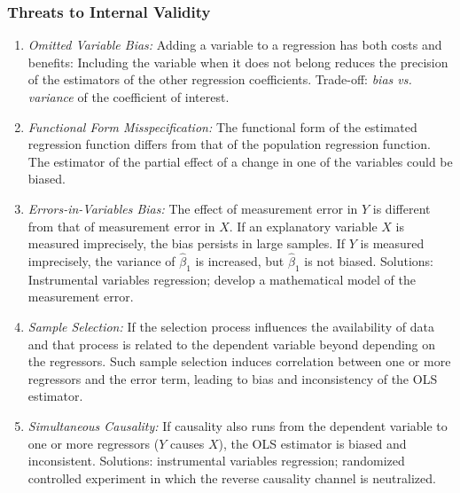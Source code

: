 

\begin{frame}[shrink=5]
\frametitle{Threats to Internal Validity}
\begin{enumerate}
\item \emph{Omitted Variable Bias:}
Adding a variable to a regression has both costs and benefits: Including the variable when it does not belong reduces the precision of the estimators of the other regression coefficients. Trade-off: \emph{bias vs. variance} of the coefficient of interest. 
\item \emph{Functional Form Misspecification:}
The functional form of the estimated regression function differs from that of the population regression function. The estimator of the partial effect of a change in one of the variables could be biased. 
\item \emph{Errors-in-Variables Bias:}
The effect of measurement error in $Y$ is different from that of measurement error in $X$. 
If an explanatory variable $X$ is measured imprecisely, the bias persists in large samples. 
If $Y$  is measured imprecisely, the variance of $\hat{\beta}_{1}$ is increased, but $\hat{\beta}_{1}$ is not biased. 
Solutions:
Instrumental variables regression; develop a mathematical model of the measurement error. 
\item \emph{Sample Selection:}
If the selection process influences the availability of data and that process is related to the dependent variable beyond depending on the regressors. Such sample selection induces correlation between one or more regressors and the error term, leading to bias and inconsistency of the OLS estimator.
\item \emph{Simultaneous Causality:}
If causality also runs from the dependent variable to one or more regressors ($Y$ causes $X$), the OLS estimator is biased and inconsistent. 
Solutions: instrumental variables regression;  randomized controlled experiment in which the reverse causality channel is neutralized.
\end{enumerate}
\end{frame}

